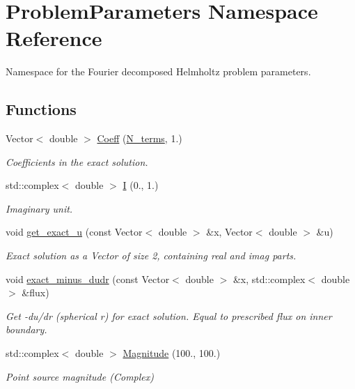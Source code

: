 \hypertarget{namespaceProblemParameters}{}\section{Problem\+Parameters Namespace Reference}
\label{namespaceProblemParameters}


Namespace for the Fourier decomposed Helmholtz problem parameters.  


\subsection*{Functions}
\begin{DoxyCompactItemize}
\item 
Vector$<$ double $>$ \hyperlink{namespaceProblemParameters_a20cc9776e745842f6126f4cd17659d19}{Coeff} (\hyperlink{namespaceProblemParameters_a6361f0f1c4a120e62d28db64baa84b40}{N\+\_\+terms}, 1.)
\begin{DoxyCompactList}\small\item\em Coefficients in the exact solution. \end{DoxyCompactList}\item 
std\+::complex$<$ double $>$ \hyperlink{namespaceProblemParameters_a869b19d379dd66b387c675ca07c6a049}{I} (0., 1.)
\begin{DoxyCompactList}\small\item\em Imaginary unit. \end{DoxyCompactList}\item 
void \hyperlink{namespaceProblemParameters_af750b29069b29bd38b5220ecf534e7f7}{get\+\_\+exact\+\_\+u} (const Vector$<$ double $>$ \&x, Vector$<$ double $>$ \&u)
\begin{DoxyCompactList}\small\item\em Exact solution as a Vector of size 2, containing real and imag parts. \end{DoxyCompactList}\item 
void \hyperlink{namespaceProblemParameters_aa544d1f3e384d3283f7113512931ea8f}{exact\+\_\+minus\+\_\+dudr} (const Vector$<$ double $>$ \&x, std\+::complex$<$ double $>$ \&flux)
\begin{DoxyCompactList}\small\item\em Get -\/du/dr (spherical r) for exact solution. Equal to prescribed flux on inner boundary. \end{DoxyCompactList}\item 
std\+::complex$<$ double $>$ \hyperlink{namespaceProblemParameters_acdaa2237a50d2ccf2b58be59c944953d}{Magnitude} (100., 100.)
\begin{DoxyCompactList}\small\item\em Point source magnitude (Complex) \end{DoxyCompactList}\end{DoxyCompactItemize}
